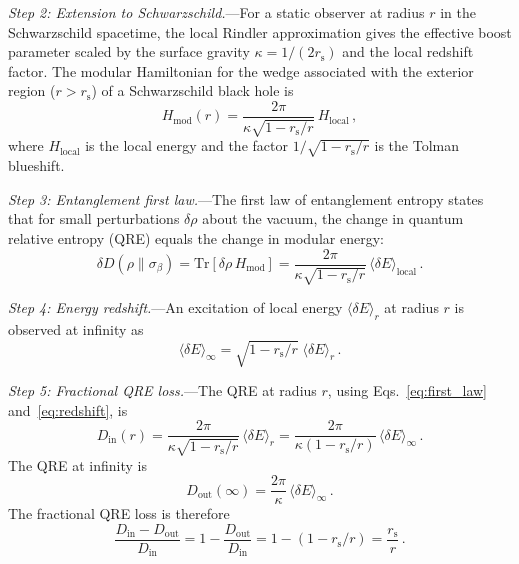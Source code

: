 \documentclass[aps,prd,preprint,superscriptaddress,longbibliography]{revtex4-2}
\newcommand{\Tr}{\mathrm{Tr}}
\newcommand{\rs}{r_{\mathrm{s}}}
\begin{document}
\emph{Step 2: Extension to Schwarzschild.}---For a static observer at
radius $r$ in the Schwarzschild spacetime, the local Rindler
approximation gives the effective boost parameter scaled by the surface
gravity $\kappa = 1/(2\rs)$ and the local redshift factor.  The modular
Hamiltonian for the wedge associated with the exterior region
($r > \rs$) of a Schwarzschild black hole is~\cite{DorauMuch2025}
\begin{equation}
  H_{\mathrm{mod}}(r) = \frac{2\pi}{\kappa\sqrt{1-\rs/r}}\,H_{\mathrm{local}}\,,
  \label{eq:Hmod}
\end{equation}
where $H_{\mathrm{local}}$ is the local energy and the factor
$1/\sqrt{1-\rs/r}$ is the Tolman blueshift.

\emph{Step 3: Entanglement first law.}---The first law of entanglement
entropy states that for small perturbations $\delta\rho$ about the
vacuum, the change in quantum relative entropy (QRE) equals the change
in modular energy:
\begin{equation}
  \delta D(\rho\|\sigma_\beta) = \Tr[\delta\rho\,H_{\mathrm{mod}}]
  = \frac{2\pi}{\kappa\sqrt{1-\rs/r}}\,\langle\delta E\rangle_{\mathrm{local}}\,.
  \label{eq:first_law}
\end{equation}

\emph{Step 4: Energy redshift.}---An excitation of local energy
$\langle\delta E\rangle_r$ at radius $r$ is observed at infinity as
\begin{equation}
  \langle\delta E\rangle_\infty = \sqrt{1-\rs/r}\;\langle\delta E\rangle_r\,.
  \label{eq:redshift}
\end{equation}

\emph{Step 5: Fractional QRE loss.}---The QRE at radius $r$, using
Eqs.~\eqref{eq:first_law} and~\eqref{eq:redshift}, is
\begin{equation}
  D_{\mathrm{in}}(r) = \frac{2\pi}{\kappa\sqrt{1-\rs/r}}\,
  \langle\delta E\rangle_r
  = \frac{2\pi}{\kappa(1-\rs/r)}\,\langle\delta E\rangle_\infty\,.
  \label{eq:Din}
\end{equation}
The QRE at infinity is
\begin{equation}
  D_{\mathrm{out}}(\infty) = \frac{2\pi}{\kappa}\,\langle\delta E\rangle_\infty\,.
  \label{eq:Dout}
\end{equation}
The fractional QRE loss is therefore
\begin{equation}
  \frac{D_{\mathrm{in}} - D_{\mathrm{out}}}{D_{\mathrm{in}}}
  = 1 - \frac{D_{\mathrm{out}}}{D_{\mathrm{in}}}
  = 1 - (1 - \rs/r)
  = \frac{\rs}{r}\,.
  \label{eq:frac_QRE}
\end{equation}
\end{document}
